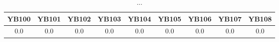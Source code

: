 \documentclass[]{article}
\begin{document}
\begin{table}[h]
	\centering
	\begin{tabular}{|c|c|c|c|c|c|c|c|c|}
		\hline
		YB100 & YB101 & YB102 & YB103 & YB104 & YB105 & YB106 & YB107 & YB108 \\
		\hline
		0.0   & 0.0   & 0.0   & 0.0   & 0.0   & 0.0   & 0.0   & 0.0   & 0.0   \\
		\hline
	\end{tabular}
	\caption{...}
\end{table}

\end{document}
